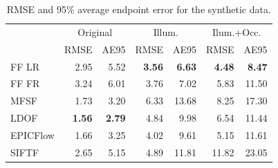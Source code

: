 \begin{table}
    \centering
    \begin{tabular}{lrrrrrr}
                                                                                                                                       \toprule
         & \multicolumn{2}{c}{Original}            & \multicolumn{2}{c}{Illum.}              & \multicolumn{2}{c}{Ilum.+Occ.}          \\
         & {\scriptsize RMSE} & {\scriptsize AE95} & {\scriptsize RMSE} & {\scriptsize AE95} & {\scriptsize RMSE} & {\scriptsize AE95} \\ \toprule
FF LR    & 2.95               & 5.52               & {\bf 3.56}         & {\bf 6.63}         & {\bf 4.48}         & {\bf 8.47}         \\
FF FR    & 3.24               & 6.01               & 3.76               & 7.02               & 5.83               & 11.50              \\
MFSF     & 1.73               & 3.20               & 6.33               & 13.68              & 8.25               & 17.30              \\
LDOF     & {\bf 1.56}         & {\bf 2.79}         & 4.84               & 9.98               & 6.54               & 11.44              \\
EPICFlow & 1.66               & 3.25               & 4.02               & 9.61               & 5.15               & 11.61              \\
SIFTF    & 2.65               & 5.15               & 4.89               & 11.81              & 11.82              & 23.05              \\ \bottomrule
    \end{tabular}
    \caption{RMSE and 95\% average endpoint error for the synthetic data.}
\label{tbl:synthetic}
\end{table}
